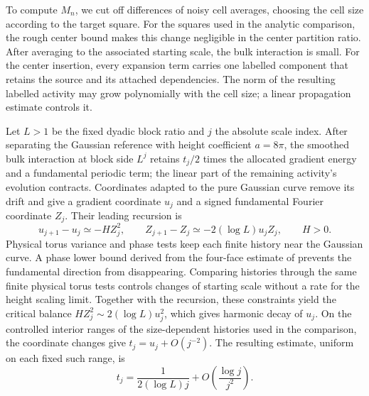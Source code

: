 To compute \(M_n\), we cut off differences of noisy cell averages,
choosing the cell size according to the target square.  For the squares
used in the analytic comparison, the rough center bound makes this change
negligible in the center partition ratio.  After averaging to the associated
starting scale, the bulk interaction is small.  For the center insertion,
every expansion term carries one labelled component that retains the source
and its attached dependencies.  The norm of the resulting labelled activity
may grow polynomially with the cell size; a linear propagation estimate
controls it.

Let \(L>1\) be the fixed dyadic block ratio and \(j\) the absolute scale index.
After separating the Gaussian reference with height coefficient \(a=8\pi\),
the smoothed bulk interaction at block side \(L^j\) retains \(t_j/2\) times
the allocated gradient energy and a fundamental periodic term; the linear
part of the remaining activity's evolution contracts.  Coordinates adapted
to the pure Gaussian curve remove its drift and give a gradient coordinate
\(u_j\) and a signed fundamental Fourier coordinate \(Z_j\).  Their leading
recursion is
\[
 u_{j+1}-u_j\simeq-HZ_j^2,\qquad
 Z_{j+1}-Z_j\simeq-2(\log L)u_jZ_j,\qquad H>0.
\]
Physical torus variance and phase tests keep each finite history near the
Gaussian curve.  A phase lower bound derived from the four-face estimate
of \cite{C} prevents the fundamental direction from disappearing.
Comparing histories through the same finite physical torus tests controls
changes of starting scale without a rate for the height scaling limit.
Together with the recursion, these constraints yield the critical balance
\(HZ_j^2\sim2(\log L)u_j^2\), which gives harmonic decay of \(u_j\).
On the controlled interior ranges of the size-dependent histories used in
the comparison, the coordinate changes give \(t_j=u_j+O(j^{-2})\).  The
resulting estimate, uniform on each fixed such range, is
\[
 t_j=\frac{1}{2(\log L)j}
       +O\left(\frac{\log j}{j^2}\right).
\]

